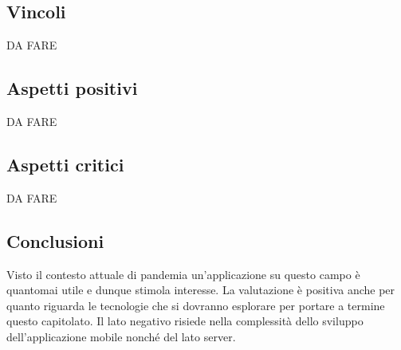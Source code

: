 \subsection{Vincoli}
DA FARE

\subsection{Aspetti positivi}
DA FARE

\subsection{Aspetti critici}
DA FARE

\subsection{Conclusioni}
Visto il contesto attuale di pandemia un'applicazione su questo campo è quantomai utile e dunque stimola interesse. La valutazione è positiva anche per quanto riguarda le tecnologie che si dovranno esplorare per portare a termine questo capitolato. Il lato negativo risiede nella complessità dello sviluppo dell'applicazione mobile nonché del lato server. 
